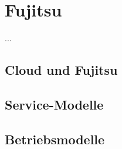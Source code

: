 \section{Fujitsu}
\label{sec_fujitsu}

...

\subsection{Cloud und Fujitsu}
\label{sec_fujitsu_general}



\subsection{Service-Modelle}
\label{sec_fujitsu_delivery}



\subsection{Betriebsmodelle}
\label{sec_fujitsu_deployment}

